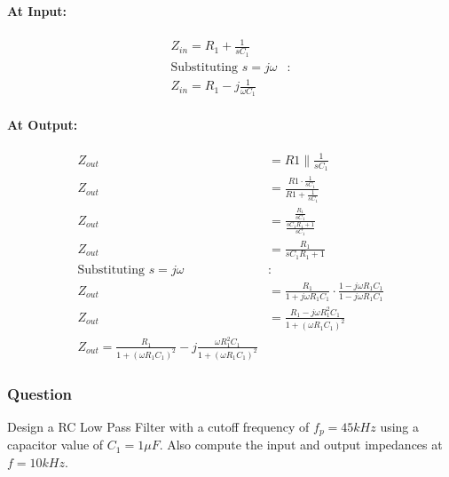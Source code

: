 \begin{enumerate}
    \paragraph{At Input:}
      \begin{align*}
        Z_{in} = R_1 + \frac{1}{sC_1} \\
        \text{Substituting } s = j \omega &: \\
        \boxed{Z_{in} = R_1 - j \frac{1}{\omega C_1}}
      \end{align*}
    \paragraph{At Output:}
      \begin{align*}
        Z_{out} &= R1 \parallel \frac{1}{sC_1} \\
        Z_{out} &= \frac{R1 \cdot \frac{1}{sC_1}}{R1 + \frac{1}{sC_1}} \\
        Z_{out} &= \frac{\frac{R_1}{sC_1}}{\frac{sC_1 R_1 + 1}{sC_1}} \\
        Z_{out} &= \frac{R_1}{sC_1 R_1 + 1} \\
        \text{Substituting } s = j \omega &: \\
        Z_{out} &= \frac{R_1}{1 + j \omega R_1 C_1} \cdot \frac{1 - j \omega R_1 C_1}{1 - j \omega R_1 C_1} \\
        Z_{out} &= \frac{R_1 - j \omega R_1^2 C_1}{1 + (\omega R_1 C_1)^2} \\
        \boxed{Z_{out} = \frac{R_1}{1 + (\omega R_1 C_1)^2} - j \frac{\omega R_1^2 C_1}{1 + (\omega R_1 C_1)^2}}
      \end{align*}
\end{enumerate}

\subsubsection{Question}
Design a RC Low Pass Filter with a cutoff frequency of
\(f_p = 45kHz\) using a capacitor value of \(C_1 = 1\mu F\).
Also compute the input and output impedances at
\(f = 10kHz\).
